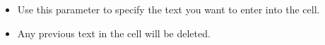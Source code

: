 
\begin{itemize}
\item Use this parameter to specify the text you want to enter into the cell.
\item Any previous text in the cell will be deleted.
\end{itemize}

